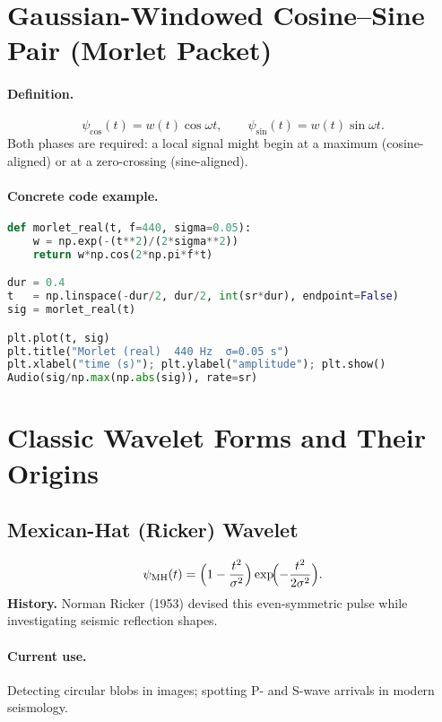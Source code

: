 \documentclass[11pt]{article}
\begin{document}
\section{Gaussian-Windowed Cosine–Sine Pair (Morlet Packet)}

\paragraph{Definition.}
\[
\psi_{\cos}(t)=w(t)\cos\omega t,\qquad
\psi_{\sin}(t)=w(t)\sin\omega t.
\]
Both phases are required: a local signal might begin at a maximum
(cosine-aligned) or at a zero-crossing (sine-aligned).

\paragraph{Concrete code example.}
\begin{lstlisting}[language=Python,caption={Plot \& play real part of a Morlet packet}]
def morlet_real(t, f=440, sigma=0.05):
    w = np.exp(-(t**2)/(2*sigma**2))
    return w*np.cos(2*np.pi*f*t)

dur = 0.4
t   = np.linspace(-dur/2, dur/2, int(sr*dur), endpoint=False)
sig = morlet_real(t)

plt.plot(t, sig)
plt.title("Morlet (real)  440 Hz  σ=0.05 s")
plt.xlabel("time (s)"); plt.ylabel("amplitude"); plt.show()
Audio(sig/np.max(np.abs(sig)), rate=sr)
\end{lstlisting}

\section{Classic Wavelet Forms and Their Origins}

\subsection{Mexican-Hat (Ricker) Wavelet}
\[
\psi_{\text{MH}}(t)=\Bigl(1-\frac{t^{2}}{\sigma^{2}}\Bigr)
                    \exp\!\Bigl(-\frac{t^{2}}{2\sigma^{2}}\Bigr).
\]
\textbf{History.}  Norman Ricker (1953) devised this even-symmetric pulse
while investigating seismic reflection shapes.

\paragraph{Current use.}  Detecting circular blobs in images; spotting
P- and S-wave arrivals in modern seismology.
\end{document}
